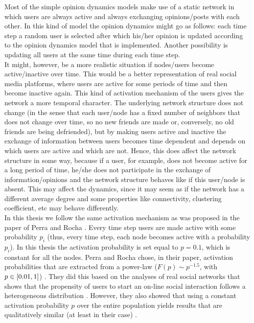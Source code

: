 \documentclass[11 pt , letterpaper , twoside , openright]{book}
\begin{document}
Most of the simple opinion dynamics models make use of a static network in which users are always active and always exchanging opinions/posts with each other. In this kind of model the opinion dynamics might go as follows: each time step a random user is selected after which his/her opinion is updated according to the opinion dynamics model that is implemented. Another possibility is updating all users at the same time during each time step. \\
\newline
It might, however, be a more realistic situation if nodes/users become active/inactive over time. This would be a better representation of real social media platforms, where users are active for some periods of time and then become inactive again. This kind of activation mechanism of the users gives the network a more temporal character. The underlying network structure does not change (in the sense that each user/node has a fixed number of neighbors that does not change over time, so no new friends are made or, conversely, no old friends are being defriended), but by making users active and inactive the exchange of information between users becomes time dependent and depends on which users are active and which are not. Hence, this does affect the network structure in some way, because if a user, for example, does not become active for a long period of time, he/she does not participate in the exchange of information/opinions and the network structure behaves like if this user/node is absent. This may affect the dynamics, since it may seem as if the network has a different average degree and some properties like connectivity, clustering coefficient, etc may behave differently. \\
\newline
In this thesis we follow the same activation mechanism as was proposed in the paper of Perra and Rocha \cite{Perra2019}. Every time step users are made active with some probability $p_i$ (thus, every time step, each node becomes active with a probability $p_i$). In this thesis the activation probability is set equal to $p = 0.1$, which is constant for all the nodes. Perra and Rocha chose, in their paper, activation probabilities that are extracted from a power-law ($F(p) \sim p^{-1.5}$, with $p \in \interval{0.01}{1}$) \cite{Perra2019}. They did this based on the analyses of real social networks that shows that the propensity of users to start an on-line social interaction follows a heterogeneous distribution \cite{Perra2012}\cite{Perra2019}. However, they also showed that using a constant activation probability $p$ over the entire population yields results that are qualitatively similar (at least in their case) \cite{Perra2019}. \\
\end{document}
